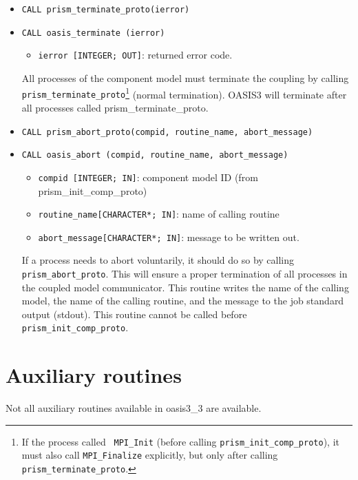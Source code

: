 \begin{itemize}

\item {\tt CALL prism\_terminate\_proto(ierror)}
\item {\tt CALL oasis\_terminate       (ierror)}
  \begin{itemize}
  \item {\tt ierror [INTEGER; OUT]}: returned error code.
  \end{itemize}
  All processes of the component model must terminate the coupling by calling {\tt
  prism\_terminate\_proto}\footnote{If the process called {\tt
  MPI\_Init} (before calling {\tt prism\_init\_comp\_proto}), it must
  also call {\tt MPI\_Finalize} explicitly, but only after calling
  {\tt prism\_terminate\_proto}.} (normal termination). OASIS3 will
  terminate after all processes called
  prism\_terminate\_proto.

\item {\tt CALL prism\_abort\_proto(compid, routine\_name, abort\_message)}
\item {\tt CALL oasis\_abort       (compid, routine\_name, abort\_message)}
\begin{itemize}
  \item {\tt compid [INTEGER; IN]}: component model ID (from
prism\_init\_comp\_proto) 
  \item {\tt routine\_name[CHARACTER*; IN]}: name of calling routine
  \item {\tt abort\_message[CHARACTER*; IN]}: message to be written out.
\end{itemize}

 If a process needs to abort voluntarily, it should do so by
 calling {\tt prism\_abort\_proto}. This will ensure a proper
 termination of all processes in the coupled model communicator. This
 routine writes the name of the calling model, the name of the
 calling routine, and the message to the job standard output (stdout). 
 This routine cannot be called before {\tt prism\_init\_comp\_proto}.

\end{itemize}


\section{Auxiliary routines}
\label{subsubsec_auxroutines}

Not all auxiliary routines available in oasis3\_3 are available.

